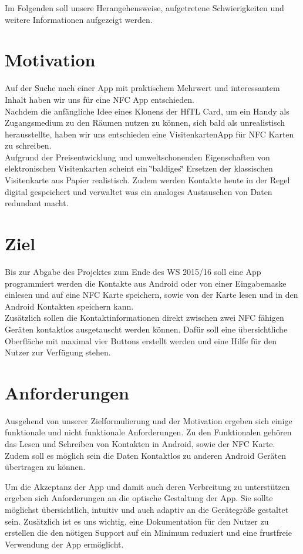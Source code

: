 \documentclass[a4paper,ngerman,12pt]{scrreprt}
\newcommand{\+}{\discretionary{\mbox{\scriptsize$\hookleftarrow$}}{}{}}
\begin{document}
Im Folgenden soll unsere Herangehensweise, aufgetretene Schwierigkeiten und weitere Informationen aufgezeigt werden.

\section{Motivation}

Auf der Suche nach einer App mit praktischem Mehrwert und interessantem Inhalt haben wir uns für eine N\+FC App entschieden. \\
Nachdem die anfängliche Idee eines Klonens der Hf\+TL Card, um ein Handy als Zugangsmedium zu den Räumen nutzen zu können, sich bald als unrealistisch herausstellte, haben wir uns entschieden eine Visitenkarten\+App für N\+FC Karten zu schreiben. \\
Aufgrund der Preisentwicklung und umweltschonenden Eigenschaften von elektronischen Visitenkarten scheint ein \char`\"{}baldiges\char`\"{} Ersetzen der klassischen Visitenkarte aus Papier realistisch. Zudem werden Kontakte heute in der Regel digital gespeichert und verwaltet was ein analoges Austauschen von Daten redundant macht.

\section{Ziel}
Bis zur Abgabe des Projektes zum Ende des WS 2015/16 soll eine App programmiert werden die Kontakte aus Android oder von einer Eingabemaske einlesen und auf eine N\+FC Karte speichern, sowie von der Karte lesen und in den Android Kontakten speichern kann. \\
Zusätzlich sollen die Kontaktinformationen direkt zwischen zwei N\+FC fähigen Geräten kontaktlos ausgetauscht werden können. Dafür soll eine übersichtliche Oberfläche mit maximal vier Buttons erstellt werden und eine Hilfe für den Nutzer zur Verfügung stehen.

\section{Anforderungen}
Ausgehend von unserer Zielformulierung und der Motivation ergeben sich einige funktionale und nicht funktionale Anforderungen.
Zu den Funktionalen gehören das Lesen und Schreiben von Kontakten in Android, sowie der NFC Karte.
Zudem soll es möglich sein die Daten Kontaktlos zu anderen Android Geräten übertragen zu können.\newline

Um die Akzeptanz der App und damit auch deren Verbreitung zu unterstützen ergeben sich Anforderungen an die optische Gestaltung der App. Sie sollte möglichst übersichtlich, intuitiv und auch adaptiv an die Gerätegröße gestaltet sein. Zusätzlich ist es uns wichtig, eine Dokumentation für den Nutzer zu erstellen die den nötigen Support auf ein Minimum reduziert und eine frustfreie Verwendung der App ermöglicht.
\end{document}
